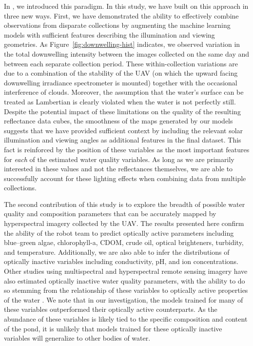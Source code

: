 In \cite{robot-team-1}, we introduced this paradigm. In this study, we have built on this approach in three new ways. First, we have demonstrated the ability to effectively combine observations from disparate collections by augmenting the machine learning models with sufficient features describing the illumination and viewing geometries. As Figure~\ref{fig:downwelling-hist} indicates, we observed variation in the total downwelling intensity between the images collected on the same day and between each separate collection period. These within-collection variations are due to a combination of the stability of the UAV (on which the upward facing downwelling irradiance spectrometer is mounted) together with the occasional interference of clouds. Moreover, the assumption that the water's surface can be treated as Lambertian is clearly violated when the water is not perfectly still. Despite the potential impact of these limitations on the quality of the resulting reflectance data cubes, the smoothness of the maps generated by our models suggests that we have provided sufficient context by including the relevant solar illumination and viewing angles as additional features in the final dataset.  This fact is reinforced by the position of these variables as the most important features for \textit{each} of the estimated water quality variables. As long as we are primarily interested in these values and not the reflectances themselves, we are able to successfully account for these lighting effects when combining data from multiple collections.

The second contribution of this study is to explore the breadth of possible water quality and composition parameters that can be accurately mapped by hyperspectral imagery collected by the UAV. The results presented here confirm the ability of the robot team to predict optically active parameters including blue--green algae, chlorophyll-a, CDOM, crude oil, optical brighteners, turbidity, and temperature. Additionally, we are also able to infer the distributions of optically inactive variables including conductivity, pH, and ion concentrations. Other studies using multispectral and hyperspectral remote sensing imagery have also estimated optically inactive water quality parameters, with the ability to do so stemming from the relationship of these variables to optically active properties of the water \cite{vakili2020determination,guo2021machine,niu2021deep}. We note that in our investigation, the models trained for many of these variables outperformed their optically active counterparts. As the abundance of these variables is likely tied to the specific composition and content of the pond, it is unlikely that models trained for these optically inactive variables will generalize to other bodies of water. 

